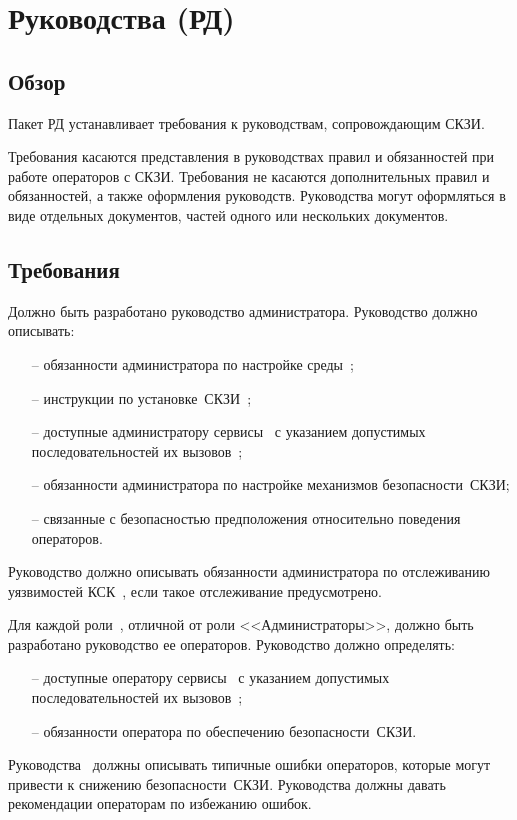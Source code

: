 \section{Руководства (РД)}\label{GD}

\subsection{Обзор}\label{GD.Intro}

Пакет РД устанавливает требования к руководствам, сопровождающим СКЗИ.

Требования касаются представления в руководствах правил и обязанностей
при работе операторов с СКЗИ. 
%
Требования не касаются дополнительных правил и обязанностей,
а также оформления руководств.
%
Руководства могут оформляться в виде отдельных документов, частей одного 
или нескольких документов.

\subsection{Требования}\label{GD.Reqs}

\label{R.GD.Admin} %
Должно быть разработано руководство администратора.
Руководство должно описывать:
\begin{itemize}
\item[--]
обязанности администратора по настройке 
среды~; 
\item[--]
инструкции по установке~СКЗИ~;
\item[--]
доступные администратору сервисы~ 
с указанием допустимых последовательностей их 
вызовов~;
\item[--]
обязанности администратора по настройке механизмов безопасности~СКЗИ;
\item[--]
связанные с безопасностью предположения 
относительно поведения операторов.
\end{itemize}
Руководство должно описывать обязанности администратора по отслеживанию 
уязвимостей КСК~, если такое отслеживание предусмотрено.

\label{R.GD.Roles} %
Для каждой роли~, отличной от роли <<Администраторы>>, 
должно быть разработано руководство ее операторов.
Руководство должно определять:
\begin{itemize}
\item[--]
доступные оператору сервисы~
с указанием допустимых последовательностей их 
вызовов~; 
\item[--]
обязанности оператора по обеспечению безопасности~СКЗИ.
\end{itemize}

\label{R.GD.Misuse} %
Руководства~ 
должны описывать типичные ошибки операторов,
которые могут привести к снижению безопасности~СКЗИ.
Руководства должны давать рекомендации операторам по избежанию
ошибок.

